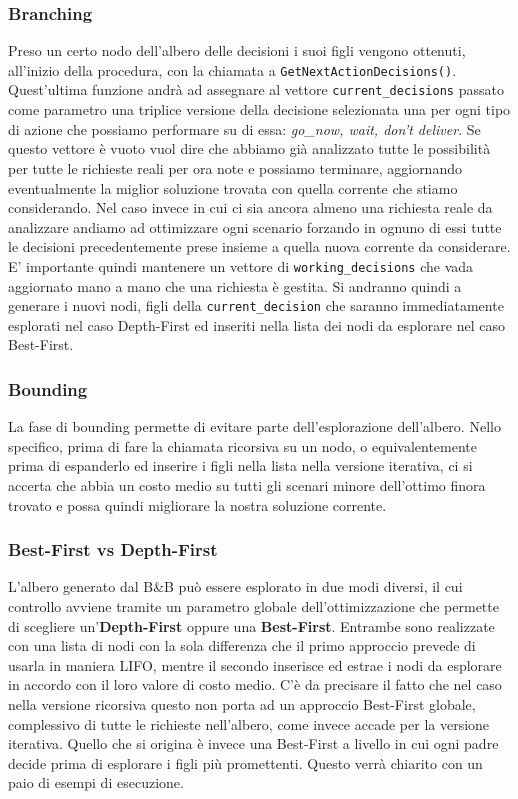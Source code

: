 \documentclass[
    article,            %
    12pt,                %
    oneside,            %
    a4paper,            %
    english,            %
    italian,                %
    sumario=tradicional,
]{abntex2}
\begin{document}
\subsubsection{Branching}
Preso un certo nodo dell'albero delle decisioni i suoi figli vengono ottenuti, all'inizio della procedura, con la chiamata a \texttt{GetNextActionDecisions()}. Quest'ultima funzione andrà ad assegnare al vettore \texttt{current\_decisions} passato come parametro una triplice versione della decisione selezionata una per ogni tipo di azione che possiamo performare su di essa: \textit{go\_now, wait, don't deliver}. Se questo vettore è vuoto vuol dire che abbiamo già analizzato tutte le possibilità per tutte le richieste reali per ora note e possiamo terminare, aggiornando eventualmente la miglior soluzione trovata con quella corrente che stiamo considerando. Nel caso invece in cui ci sia ancora almeno una richiesta reale da analizzare andiamo ad ottimizzare ogni scenario forzando in ognuno di essi tutte le decisioni precedentemente prese insieme a quella nuova corrente da considerare. E' importante quindi mantenere un vettore di \texttt{working\_decisions} che vada aggiornato mano a mano che una richiesta è gestita. Si andranno quindi a generare i nuovi nodi, figli della \texttt{current\_decision} che saranno immediatamente esplorati nel caso Depth-First ed inseriti nella lista dei nodi da esplorare nel caso Best-First. 

\subsubsection{Bounding}
La fase di bounding permette di evitare parte dell'esplorazione dell'albero. Nello specifico, prima di fare la chiamata ricorsiva su un nodo, o equivalentemente prima di espanderlo ed inserire i figli nella lista nella versione iterativa, ci si accerta che abbia un costo medio su tutti gli scenari minore dell'ottimo finora trovato e possa quindi migliorare la nostra soluzione corrente.

\subsubsection{Best-First vs Depth-First}
L'albero generato dal B\&B può essere esplorato in due modi diversi, il cui controllo avviene tramite un parametro globale dell'ottimizzazione che permette di scegliere un'\textbf{Depth-First} oppure una \textbf{Best-First}. Entrambe sono realizzate con una lista di nodi con la sola differenza che il primo approccio prevede di usarla in maniera LIFO, mentre il secondo inserisce ed estrae i nodi da esplorare in accordo con il loro valore di costo medio. C'è da precisare il fatto che nel caso nella versione ricorsiva questo non porta ad un approccio Best-First globale, complessivo di tutte le richieste nell'albero, come invece accade per la versione iterativa. Quello che si origina è invece una Best-First a livello in cui ogni padre decide prima di esplorare i figli più promettenti. Questo verrà chiarito con un paio di esempi di esecuzione.
\end{document}
